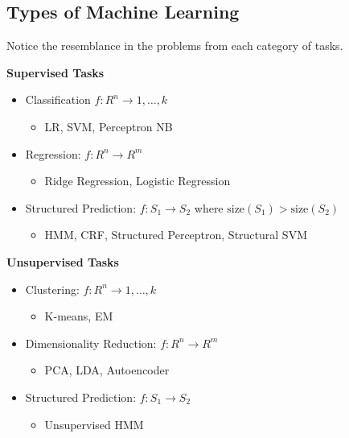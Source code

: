 \documentclass[a4paper]{article}
\begin{document}
\subsection{Types of Machine Learning}
\begin{framed}
	\begin{displayquote}
		Notice the resemblance in the problems from each category of tasks.
	\end{displayquote}
\end{framed}
\textbf{Supervised Tasks}
\begin{itemize}
	\item Classification $f: R^n \rightarrow { 1,\ldots, k }$
	\begin{itemize}[label=$\circ$]
		\item LR, SVM, Perceptron NB
	\end{itemize}
	\item Regression: $f: R^n \rightarrow R^m$
	\begin{itemize}[label=$\circ$]
		\item Ridge Regression, Logistic Regression
	\end{itemize}
	\item Structured Prediction: $f: S_1 \rightarrow S_2$ where $\text{size}(S_1) >\text{size}(S_2)$
	\begin{itemize}[label=$\circ$]
		\item HMM, CRF, Structured Perceptron, Structural SVM
	\end{itemize}
\end{itemize}
\textbf{Unsupervised Tasks}
\begin{itemize}
	\item Clustering: $f: R^n \rightarrow { 1,\ldots,k }$
	\begin{itemize}[label=$\circ$]
		\item K-means, EM
	\end{itemize}
	\item Dimensionality Reduction: $f: R^n \rightarrow R^m$
	\begin{itemize}[label=$\circ$]
		\item PCA, LDA, Autoencoder
	\end{itemize}
	\item Structured Prediction: $f: S_1 \rightarrow S_2$
	\begin{itemize}[label=$\circ$]
		\item Unsupervised HMM
	\end{itemize}
\end{itemize}
\newpage
\end{document}
